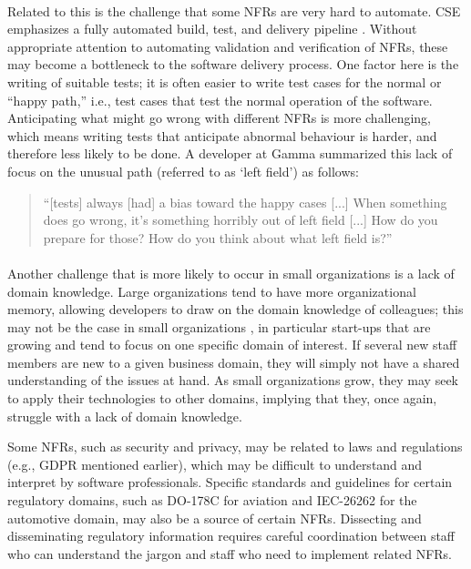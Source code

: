 \documentclass[smallextended]{svjour3}        %
\providecommand{\DIFaddtex}[1]{{\protect\color{blue}\uwave{#1}}} %
\providecommand{\DIFaddbegin}{} %
\providecommand{\DIFaddend}{} %
\providecommand{\DIFadd}[1]{\texorpdfstring{\DIFaddtex{#1}}{#1}} %
\newcommand{\DIFaddincludegraphics}[2][]{{\color{blue}\fbox{\DIFOincludegraphics[#1]{#2}}}} %
\DeclareRobustCommand{\DIFaddbegin}{\DIFOaddbegin \let\includegraphics\DIFaddincludegraphics} %
\DeclareRobustCommand{\DIFaddend}{\DIFOaddend \let\includegraphics\DIFOincludegraphics} %
\begin{document}
\DIFaddbegin \paragraph{\DIFadd{NFRs are hard to automate}} \DIFaddend Related to this is the challenge that some NFRs are very hard to automate.  CSE emphasizes a fully automated build, test, and delivery pipeline \citep{fitzgerald2017continuous,fowler-continuous-int,klotins2023continuous}.  
Without appropriate attention to automating validation and verification of NFRs, these may become a bottleneck to the software delivery process.
One factor here is the writing of suitable tests; it is often easier to write test cases for the normal or ``happy path,'' i.e., test cases that test the normal operation of the software. Anticipating what might go wrong with different NFRs is more challenging, which means writing tests that anticipate abnormal behaviour is harder, and therefore less likely to be done. A developer at Gamma summarized this lack of focus on the unusual path (referred to as `left field') as follows:
\begin{quote}
    ``[tests] always [had] a bias toward the happy cases [...] When something does go wrong, it's something horribly out of left field [...] How do you prepare for those? How do you think about what left field is?''
\end{quote}    

\DIFaddbegin \paragraph{\DIFadd{Lack of domain knowledge}} \DIFaddend Another challenge that is more likely to occur in small organizations is a lack of domain knowledge. Large organizations tend to have more organizational memory, allowing developers to draw on the domain knowledge of colleagues; this may not be the case in small organizations \citep{richardson2007guest,sanchez2016understanding}, in particular start-ups that are growing and tend to focus on one specific domain of interest. If several new staff members are new to a given business domain, they will simply not have a shared understanding of the issues at hand.
As small organizations grow, they may seek to apply their technologies to other domains, implying that they, once again, struggle with a lack of domain knowledge. 

Some NFRs, such as security and privacy, may be related to laws and regulations (e.g., GDPR mentioned earlier), which may be difficult to understand and interpret by software professionals. Specific standards and guidelines for certain regulatory domains, such as DO-178C for aviation and IEC-26262 for the automotive domain, may also be a source of certain NFRs.
Dissecting and disseminating regulatory information requires careful coordination between staff who can understand the jargon and staff who need to implement related NFRs. 
\end{document}

